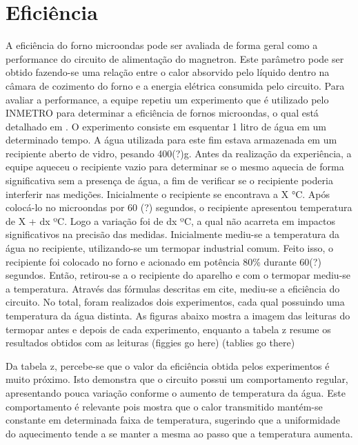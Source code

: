 \section{Eficiência}
A eficiência do forno microondas pode ser avaliada de forma geral como a performance do circuito de alimentação do magnetron. Este parâmetro pode ser obtido fazendo-se uma relação entre o calor absorvido pelo líquido dentro na câmara de cozimento do forno e a energia elétrica consumida pelo circuito.
Para avaliar a performance, a equipe repetiu um experimento que é utilizado pelo INMETRO para determinar a eficiência de fornos microondas, o qual está detalhado em \cite{Inmetro}. O experimento consiste em esquentar 1 litro de água em um determinado tempo. A água utilizada para este fim estava armazenada em um recipiente aberto de vidro, pesando 400(?)g. Antes da realização da experiência, a equipe aqueceu o recipiente vazio para determinar se o mesmo aquecia de forma significativa sem a presença de água, a fim de verificar se o recipiente poderia interferir nas medições. Inicialmente o recipiente se encontrava a X °C. Após colocá-lo no microondas por 60 (?) segundos, o recipiente apresentou temperatura de X + dx ºC. Logo a variação foi de dx ºC, a qual não acarreta em impactos significativos na precisão das medidas.
Inicialmente mediu-se a temperatura da água no recipiente, utilizando-se um termopar industrial comum. Feito isso, o recipiente foi colocado no forno e acionado em potência 80\% durante 60(?) segundos. Então, retirou-se a o recipiente do aparelho e com o termopar mediu-se a temperatura. Através das fórmulas descritas em cite, mediu-se a eficiência do circuito. No total, foram realizados dois experimentos, cada qual possuindo uma temperatura da água distinta. As figuras abaixo mostra a imagem das leituras do termopar antes e depois de cada experimento, enquanto a tabela z resume os resultados obtidos com as leituras
(figgies go here)
(tablies go there)


Da tabela z, percebe-se que o valor da eficiência obtida pelos experimentos é muito próximo. Isto demonstra que o circuito possui um comportamento regular, apresentando pouca variação conforme o aumento de temperatura da água. Este comportamento é relevante pois mostra que o calor transmitido mantém-se constante em determinada faixa de temperatura, sugerindo que a uniformidade do aquecimento tende a se manter a mesma ao passo que a temperatura aumenta. 
